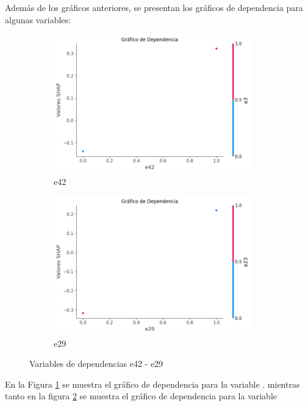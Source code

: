 Además de los gráficos anteriores, se presentan los gráficos de dependencia para algunas variables:

\begin{figure}[H]
    
    \begin{subfigure}{0.5\textwidth}
        \includegraphics[width=0.9\linewidth, height=6cm]{img/shap_lr/e42.png}
        \caption{e42}
        \label{fig:dependencia_e42_lr}
    \end{subfigure}
    \begin{subfigure}{0.5\textwidth}
        \includegraphics[width=0.9\linewidth, height=6cm]{img/shap_lr/e29.png}
        \caption{e29}
        \label{fig:dependencia_e29_lr}
    \end{subfigure}

    \caption{Variables de dependencias e42 - e29}
    \label{fig:image2}
\end{figure}

En la Figura \ref{fig:dependencia_e42_lr} se muestra el gráfico de dependencia para la variable . mientras tanto en la figura \ref{fig:dependencia_e29_lr} se muestra el gráfico de dependencia para la variable 

